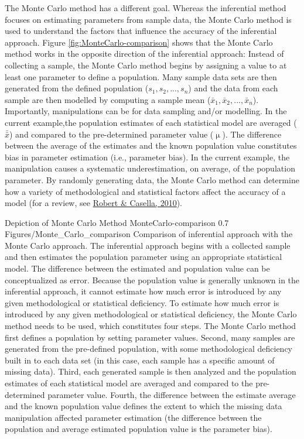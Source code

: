 \documentclass[
12pt, %
twoside,
english]{guelphthesis}
\begin{document}
The Monte Carlo method has a different goal. Whereas the inferential method focuses on estimating parameters from sample data, the Monte Carlo method is used to understand the factors that influence the accuracy of the inferential approach. Figure \ref{fig:MonteCarlo-comparison} shows that the Monte Carlo method works in the opposite direction of the inferential approach: Instead of collecting a sample, the Monte Carlo method begins by assigning a value to at least one parameter to define a population. Many sample data sets are then generated from the defined population (\(s_1, s_2, ..., s_n\)) and the data from each sample are then modelled by computing a sample mean (\(\bar{x}_1, \bar{x}_2, ..., \bar{x}_n\)). Importantly, manipulations can be for data sampling and/or modelling. In the current example,the population estimates of each statistical model are averaged (\(\bar{\bar{x}}\)) and compared to the pre-determined parameter value (\(\upmu\)). The difference between the average of the estimates and the known population value constitutes bias in parameter estimation (i.e., parameter bias). In the current example, the manipulation causes a systematic underestimation, on average, of the population parameter. By randomly generating data, the Monte Carlo method can determine how a variety of methodological and statistical factors affect the accuracy of a model (for a review, see \protect\hyperlink{ref-robert2010}{Robert \& Casella, 2010}).
\begin{apaFigure}
[landscape]
[samepage]
[0cm]
{Depiction of Monte Carlo Method}
{MonteCarlo-comparison}
{0.7}
{Figures/Monte_Carlo_comparison}
{Comparison of inferential approach with the Monte Carlo approach. The inferential approach begins with a collected sample and then estimates the population parameter using an appropriate statistical model. The difference between the estimated and population value can be conceptualized as error. Because the population value is generally unknown in the inferential approach, it cannot estimate how much error is introduced by any given methodological or statistical deficiency. To estimate how much error is introduced by any given methodological or statistical deficiency, the Monte Carlo method needs to be used, which constitutes four steps. The Monte Carlo method first defines a population by setting parameter values. Second, many samples are generated from the pre-defined population, with some methodological deficiency built in to each data set (in this case, each sample has a specific amount of missing data). Third, each generated sample is then analyzed and the population estimates of each statistical model are averaged and compared to the pre-determined parameter value. Fourth, the difference between the estimate average and the known population value defines the extent to which the missing data manipulation affected parameter estimation (the difference between the population and average estimated population value is the parameter bias).}
\end{apaFigure}
\end{document}
